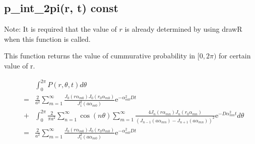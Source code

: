 \documentclass{article}
\begin{document}
\subsection{p\_int\_2pi(r, t) const}

Note: It is required that the value of $r$ is already determined by using drawR when this function is called.

This function returns the value of cummurative probability in $[0,2\pi)$ for certain value of r.

\begin{eqnarray}
    & & \int^{2\pi}_0 P(r, \theta, t) d\theta \nonumber\\
    &=& \frac{2}{a^2} \sum^{\infty}_{m=1}
        \frac{J_0(r\alpha_{m0}) J_0(r_0\alpha_{m0})}{J^2_1(a\alpha_{m0})}
        \mathrm{e}^{-\alpha^2_{m0}Dt} \nonumber \\
    &+& \int^{2\pi}_0 \frac{2}{\pi a^2}\sum^{\infty}_{n=1}\cos(n\theta)\sum^{\infty}_{m=1}
        \frac{4J_n(r\alpha_{mn})J_n(r_0\alpha_{mn})}{(J_{n-1}(a\alpha_{mn})-J_{n+1}(a\alpha_{mn}))^2}
        \mathrm{e}^{-D\alpha^2_{mn} t} d\theta \nonumber \\
    &=& \frac{2}{a^2} \sum^{\infty}_{m=1}
        \frac{J_0(r\alpha_{m0}) J_0(r_0\alpha_{m0})}{J^2_1(a\alpha_{m0})}
        \mathrm{e}^{-\alpha^2_{m0}Dt} \nonumber
\end{eqnarray}
\end{document}
